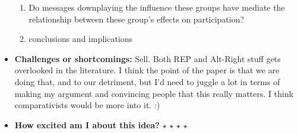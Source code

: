 \documentclass[12pt]{article}
\begin{document}
\begin{itemize}
\begin{enumerate}
            \item Do messages downplaying the influence these groups have mediate the relationship between these group's effects on participation?
            \item conclusions and implications
        \end{enumerate}
        \item \textbf{Challenges or shortcomings:} Sell. Both REP and Alt-Right stuff gets overlooked in the literature. I think the point of the paper is that we are doing that, and to our detriment, but I'd need to juggle a lot in terms of making my argument and convincing people that this really matters. I think comparativists would be more into it. :)
        \item \textbf{How excited am I about this idea?} $\star$ $\star$ $\star$ $\star$
    \end{itemize}
\end{document}
